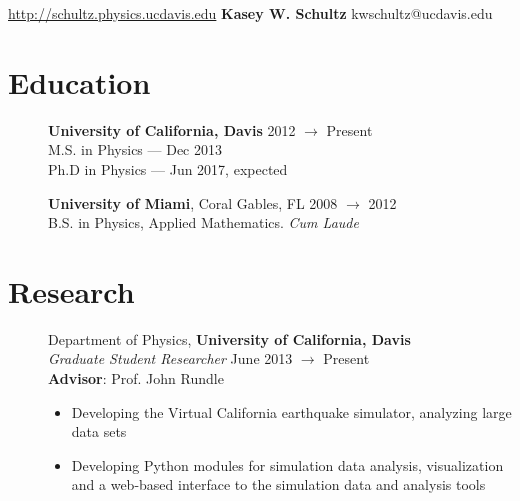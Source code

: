\documentclass[margin,line]{resume}
\begin{document}


{ \hspace{-2.1cm} \href{http://schultz.physics.ucdavis.edu}{http://schultz.physics.ucdavis.edu}  \hspace{2cm} {\sc \Large \textbf{Kasey W. Schultz}}  \hfill kwschultz@ucdavis.edu}


\begin{resume}
\vspace{1mm}

\section{\mysidestyle \textbf{Education}} 
\begin{description}
    \item[] \textbf{University of California, Davis} \hfill 2012 $\rightarrow$ Present \\
    M.S. in Physics --- Dec 2013 \\
    Ph.D in Physics --- Jun 2017, expected \vspace{-2mm} \\

    \item[] \textbf{University of Miami}, Coral Gables, FL \hfill 2008 $\rightarrow$ 2012 \\
    B.S. in Physics, Applied Mathematics. \textit{Cum Laude} 
\end{description}



\section{\mysidestyle \textbf{Research}}\vspace{4mm}
\begin{description}

    \item[] \normalsize Department of Physics, \textbf{University of California, Davis} \\
    \emph{Graduate Student Researcher} \hfill June 2013 $\rightarrow$ Present \\
    \textbf{Advisor}: Prof. John Rundle
    \begin{itemize}
        \item Developing the Virtual California earthquake simulator, analyzing large data sets
        \item Developing Python modules for simulation data analysis, visualization and a web-based interface to the simulation data and analysis tools
    \end{itemize} \vspace{1mm}


\end{description}
\end{resume}
\end{document}
